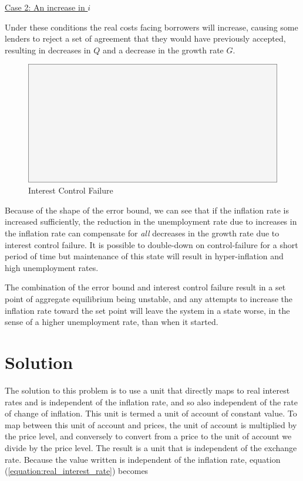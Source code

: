 \underline{Case 2: An increase in $i$} 

Under these conditions the real costs facing borrowers will increase, causing some lenders to reject
a set of agreement that they would have previously accepted, resulting in decreases in $Q$ and a
decrease in the growth rate $G$.

\begin{figure}[H]
\centering
\includegraphics[scale=0.48]{blank}
\caption{Interest Control Failure}
\label{fig:interest_control_failure}
\end{figure}

Because of the shape of the error bound, we can see that if the inflation rate is increased
sufficiently, the reduction in the unemployment rate due to increases in the inflation rate can
compensate for \emph{all} decreases in the growth rate due to interest control failure. It is
possible to double-down on control-failure for a short period of time but maintenance of this state
will result in hyper-inflation and high unemployment rates.

The combination of the error bound and interest control failure result in a set point of aggregate
equilibrium being unstable, and any attempts to increase the inflation rate toward the set point
will leave the system in a state worse, in the sense of a higher unemployment rate, than when it
started.

\section{Solution}

The solution to this problem is to use a unit that directly maps to real interest rates and is
independent of the inflation rate, and so also independent of the rate of change of inflation. This
unit is termed a unit of account of constant value. To map between this unit of account and prices,
the unit of account is multiplied by the price level, and conversely to convert from a price to the
unit of account we divide by the price level. The result is a unit that is independent of the
exchange rate. Because the value written is independent of the inflation rate, equation
(\ref{equation:real_interest_rate}) becomes

